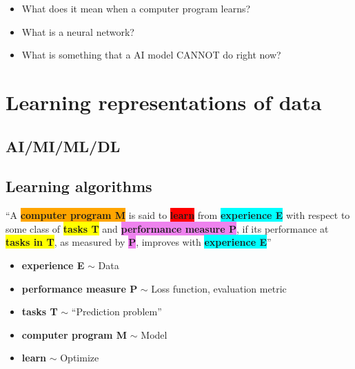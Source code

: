 \begin{summary}
    \begin{itemize}
        \item What does it mean when a computer program learns?
        \item What is a neural network?
        \item What is something that a AI model CANNOT do right now?
    \end{itemize}
\end{summary}

\section{Learning representations of data}
\subsection{AI/MI/ML/DL}
\begin{definition}
\end{definition}
\subsection{Learning algorithms}
\begin{definition}
    \textquotedblleft A \colorbox{orange}{\textbf{computer program M}} is said to \colorbox{red}{\textbf{learn}} from \colorbox{cyan}{\textbf{experience E}} with respect to some class of \colorbox{yellow}{\textbf{tasks T}} and \colorbox{violet}{\textbf{performance measure P}}, if its performance at \colorbox{yellow}{\textbf{tasks in T}}, as measured by \colorbox{violet}{\textbf{P}}, improves with \colorbox{cyan}{\textbf{experience E}}\textquotedblright
    \vspace{1em}

    \begin{itemize}
        \item \textbf{\color{cyan}experience E} $\sim$ Data
        \item \textbf{\color{violet}performance measure P} $\sim$ Loss function, evaluation metric
        \item \textbf{\color{yellow}tasks T} $\sim$ ``Prediction problem''
        \item \textbf{\color{orange}computer program M} $\sim$ Model
        \item \textbf{\color{red}learn} $\sim$ Optimize
    \end{itemize}
\end{definition}


